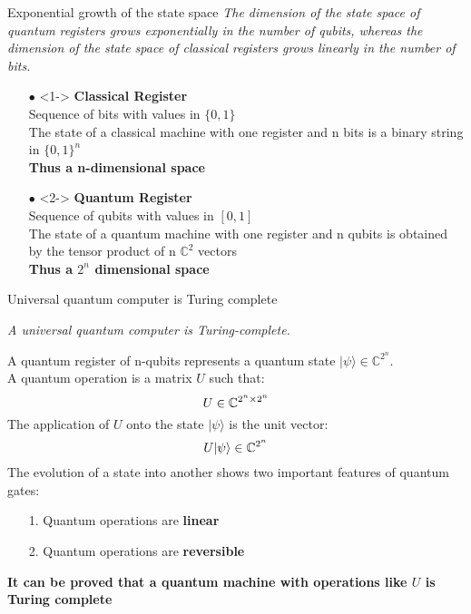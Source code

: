 		\begin{frame}{Exponential growth of the state space}
			\small{\emph{The dimension of the state space of quantum registers grows exponentially in the number of qubits, whereas the dimension of the state space of classical registers grows linearly in the number of bits.\\}}
			
			\vspace{0.4cm}
			
			\begin{itemize}
				\item[$\bullet$] <1-> \textbf{Classical Register} \\
				Sequence of bits with values in $\{0,1\}$ \\
				The state of a classical machine with one register and n bits is a binary string in $\{0,1\}^n$ \\
				\textbf{Thus a n-dimensional space}
				
				\item[$\bullet$] <2-> \textbf{Quantum Register} \\
				Sequence of qubits with values in $[0,1]$ \\
				The state of a quantum machine with one register and n qubits is obtained by the tensor product of n $\mathbb{C}^2$ vectors \\
				\textbf{Thus a $2^n$ dimensional space}	
			\end{itemize}
		\end{frame}
	
		\begin{frame}{Universal quantum computer is Turing complete}
			\small
			\begin{center}
				\vspace{-1cm}
				\emph{A universal quantum computer is Turing-complete.}
			\end{center}
			A quantum register of n-qubits represents a quantum state $|\psi\rangle\in\mathbb{C}^{2^n}$.\\
			A quantum operation is a matrix $U$ such that:
			\begin{equation*}
				\centering
				U\in\mathbb{C}^{2^n\times 2^n}
			\end{equation*}
			The application of $U$ onto the state $|\psi\rangle$ is the unit vector:
			\begin{equation*}
				\centering
				U|\psi\rangle\in\mathbb{C}^{2^n}
			\end{equation*}
			The evolution of a state into another shows two important features of quantum gates:
			\begin{itemize}
				\item[1.] Quantum operations are \textbf{linear}
				\item[2.] Quantum operations are \textbf{reversible}
			\end{itemize}
			\textbf{It can be proved that a quantum machine with operations like $U$ is Turing complete}
		\end{frame}
	
